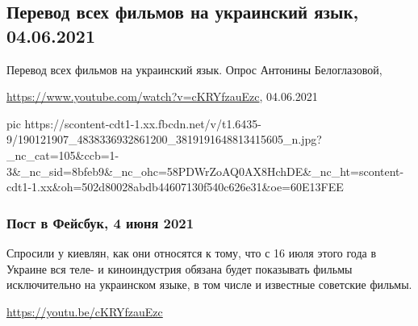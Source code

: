  
 
 
 
 
\subsection{Перевод всех фильмов на украинский язык, 04.06.2021}
\label{sec:stranaua.oprosy_beloglazova.04_06_2021.kiev.mova_filmy}

Перевод всех фильмов на украинский язык. Опрос Антонины Белоглазовой,\par
\url{https://www.youtube.com/watch?v=cKRYfzauEzc}, 04.06.2021

\ifcmt
  pic https://scontent-cdt1-1.xx.fbcdn.net/v/t1.6435-9/190121907_4838336932861200_3819191648813415605_n.jpg?_nc_cat=105&ccb=1-3&_nc_sid=8bfeb9&_nc_ohc=58PDWrZoAQ0AX8HchDE&_nc_ht=scontent-cdt1-1.xx&oh=502d80028abdb44607130f540c626e31&oe=60E13FEE
\fi

\subsubsection{Пост в Фейсбук, 4 июня 2021}

Спросили у киевлян, как они относятся к тому, что с 16 июля этого года в
Украине вся теле- и киноиндустрия обязана будет показывать фильмы исключительно
на украинском языке, в том числе и известные советские фильмы.

\url{https://youtu.be/cKRYfzauEzc}

